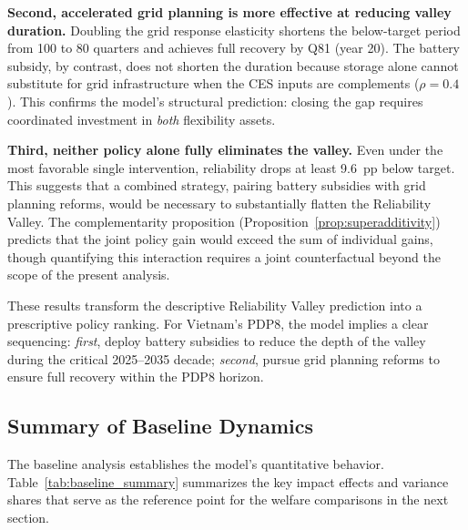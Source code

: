 \documentclass[12pt, a4paper]{article}
\begin{document}
	\textbf{Second, accelerated grid planning is more effective at reducing valley duration.} Doubling the grid response elasticity shortens the below-target period from 100 to 80 quarters and achieves full recovery by Q81 (year 20). The battery subsidy, by contrast, does not shorten the duration because storage alone cannot substitute for grid infrastructure when the CES inputs are complements ($\rho = 0.4$). This confirms the model's structural prediction: closing the gap requires coordinated investment in \textit{both} flexibility assets.
	
	\textbf{Third, neither policy alone fully eliminates the valley.} Even under the most favorable single intervention, reliability drops at least 9.6~pp below target. This suggests that a combined strategy, pairing battery subsidies with grid planning reforms, would be necessary to substantially flatten the Reliability Valley. The complementarity proposition (Proposition~\ref{prop:superadditivity}) predicts that the joint policy gain would exceed the sum of individual gains, though quantifying this interaction requires a joint counterfactual beyond the scope of the present analysis.
	
	These results transform the descriptive Reliability Valley prediction into a prescriptive policy ranking. For Vietnam's PDP8, the model implies a clear sequencing: \textit{first}, deploy battery subsidies to reduce the depth of the valley during the critical 2025--2035 decade; \textit{second}, pursue grid planning reforms to ensure full recovery within the PDP8 horizon.
	
	\subsection{Summary of Baseline Dynamics}
	
	The baseline analysis establishes the model's quantitative behavior. Table~\ref{tab:baseline_summary} summarizes the key impact effects and variance shares that serve as the reference point for the welfare comparisons in the next section.
	
\end{document}
